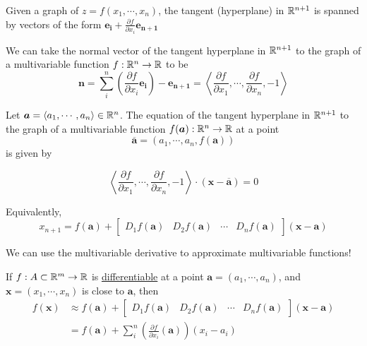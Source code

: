 \begin{proposition}
    Given a graph of $z = f(x_1, \cdots, x_n)$, the tangent (hyperplane) in $\mathbb{R}^{n+1}$ is spanned by vectors of the form $\bm{e_i} + \frac{\partial f}{\partial x_i}\bm{e_{n+1}}$
    \end{proposition}
    
    
    \begin{proposition}
    We can take the normal vector of the tangent hyperplane in $\mathbb{R}^{n+1}$ to the graph of a multivariable function $f : \mathbb{R}^n \to \mathbb{R}$ to be 
    $$\bm{n} = \sum_{i}^n \left(\frac{\partial f}{\partial x_i}\bm{e_i}\right) -\bm{e_{n+1}} = \left\langle \frac{\partial f}{\partial x_1}, \cdots, \frac{\partial f}{\partial x_n}, -1\right\rangle $$
    \end{proposition}

    \begin{theorem}
    Let $\bm{a} = \langle a_1, \cdots, a_n \rangle \in \mathbb{R}^n$.  The equation of the tangent hyperplane in $\mathbb{R}^{n+1}$ to the graph of a multivariable function $f(\bm{a}) : \mathbb{R}^n \to \mathbb{R}$ at a point $$\bm{\overline{a}} = (a_1, \cdots, a_n, f(\bm{a}))$$ is given by 
    
    
    $$\left\langle \frac{\partial f}{\partial x_1}, \cdots, \frac{\partial f}{\partial x_n}, -1 \right\rangle \cdot (\bm{x} - \bm{\overline{a}}) = 0$$

    Equivalently, $$x_{n+1} = f(\bm{a}) + \begin{bmatrix}
D_1f(\bm{a}) & D_2f(\bm{a}) & \cdots & D_nf(\bm{a})
\end{bmatrix} (\bm{x} - \bm{a}) $$
    \end{theorem}

 We can use the multivariable derivative to approximate multivariable functions!

 \begin{theorem}
    
    If $f : A \subset \mathbb{R}^m \to \mathbb{R}$ is \underline{differentiable} at a point $\bm{a} = (a_1, \cdots, a_n)$, and $\bm{x}= (x_1, \cdots, x_n)$ is close to $\bm{a}$, then 
    \begin{align*}
     f(\bm{x}) &\approx f(\bm{a}) + \begin{bmatrix}
D_1f(\bm{a}) & D_2f(\bm{a}) & \cdots & D_nf(\bm{a})
\end{bmatrix} (\bm{x} - \bm{a}) \\
    &= f(\bm{a}) + \sum_{i}^n \left(\frac{\partial f}{\partial x_i}(\bm{a})\right)(x_i - a_i)   
    \end{align*}
    
    \end{theorem}

